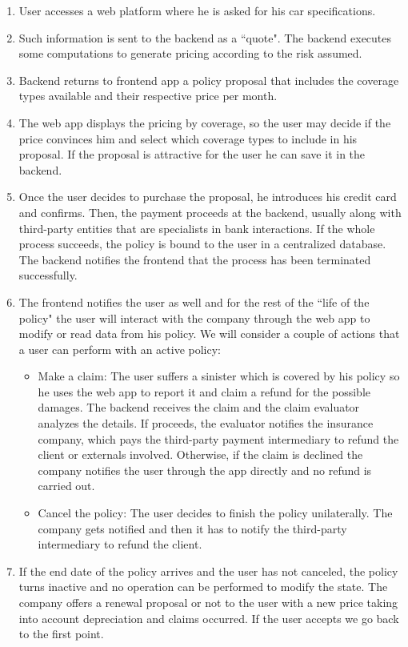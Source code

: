 \begin{enumerate}
\label{enumerate:insurance-flow}
    \item User accesses a web platform where he is asked for his car specifications.
    \item Such information is sent to the backend as a ``{quote}". The backend executes some computations to generate pricing according to the risk assumed.
    \item Backend returns to frontend app a policy proposal that includes the coverage types available and their respective price per month.
    \item The web app displays the pricing by coverage, so the user may decide if the price convinces him and select which coverage types to include in his proposal. If the proposal is attractive for the user he can save it in the backend.
    \item Once the user decides to purchase the proposal, he introduces his credit card and confirms. Then, the payment proceeds at the backend, usually along with third-party entities that are specialists in bank interactions. If the whole process succeeds, the policy is bound to the user in a centralized database. The backend notifies the frontend that the process has been terminated successfully.
    \item The frontend notifies the user as well and for the rest of the ``life of the policy" the user will interact with the company through the web app to modify or read data from his policy. We will consider a couple of actions that a user can perform with an active policy:
    \begin{itemize}
        \item Make a claim: The user suffers a sinister which is covered by his policy so he uses the web app to report it and claim a refund for the possible damages. The backend receives the claim and the claim evaluator analyzes the details. If proceeds, the evaluator notifies the insurance company, which pays the third-party payment intermediary to refund the client or externals involved. Otherwise, if the claim is declined the company notifies the user through the app directly and no refund is carried out.
        \item Cancel the policy: The user decides to finish the policy unilaterally. The company gets notified and then it has to notify the third-party intermediary to refund the client.
    \end{itemize}
    \item If the end date of the policy arrives and the user has not canceled, the policy turns inactive and no operation can be performed to modify the state. The company offers a renewal proposal or not to the user with a new price taking into account depreciation and claims occurred. If the user accepts we go back to the first point.
\end{enumerate}

